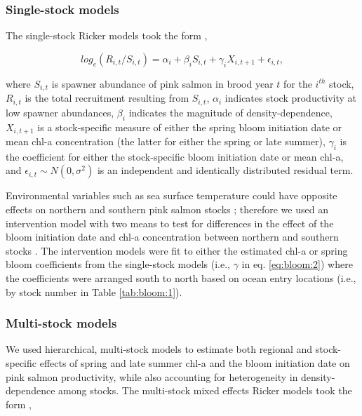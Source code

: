 \subsubsection{Single-stock models}

The single-stock Ricker models took the form \citep{Adkison1996b},

\begin{equation}
log_e(R_{i,t} / S_{i,t}) = \alpha_i + \beta_i S_{i,t} + \gamma_i
X_{i,t+1} + \epsilon_{i,t}, \label{eq:bloom:2}
\end{equation}

\noindent where \(S_{i,t}\) is spawner abundance of pink salmon in brood year
\(t\) for the \(i^{th}\) stock, \(R_{i,t}\) is the total recruitment resulting
from \(S_{i,t}\), \(\alpha_i\) indicates stock productivity at low spawner
abundances, \(\beta_i\) indicates the magnitude of density-dependence,
\(X_{i,t+1}\) is a stock-specific measure of either the spring bloom initiation
date or mean chl-a concentration (the latter for either the spring or late
summer), \(\gamma_i\) is the coefficient for either the stock-specific bloom
initiation date or mean chl-a, and \(\epsilon_{i,t} \sim N(0, \sigma^2)\) is an
independent and identically distributed residual term.

Environmental variables such as sea surface temperature could have opposite
effects on northern and southern pink salmon stocks \citep{Mueter2002a,
Su2004a}; therefore we used an intervention model with two means
\citep{Chatfield2004, Mueter2002a} to test for differences in the effect of the
bloom initiation date and chl-a concentration between northern and southern
stocks \citep{Chatfield2004, Mueter2002a}. The intervention models were fit to
either the estimated chl-a or spring bloom coefficients from the single-stock
models (i.e., \(\gamma\) in eq. \ref{eq:bloom:2}) where the coefficients were
arranged south to north based on ocean entry locations (i.e., by stock number in
Table \ref{tab:bloom:1}).


\subsubsection{Multi-stock models}

We used hierarchical, multi-stock models to estimate both regional and
stock-specific effects of spring and late summer chl-a and the bloom initiation
date on pink salmon productivity, while also accounting for heterogeneity in
density-dependence among stocks. The multi-stock mixed effects Ricker models
took the form \citep{Myers1999a, Mueter2002a},

